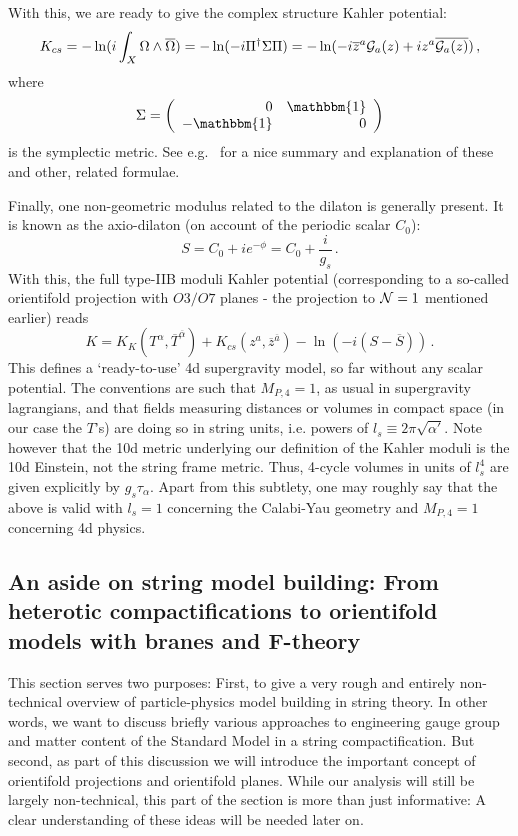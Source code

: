 \documentclass[12pt]{article}
\newcommand{\be}{\begin{equation}}
\newcommand{\ee}{\end{equation}}
\newcommand{\ol}{\overline}
\numberwithin{equation}{section}
\begin{document}
With this, we are ready to give the complex structure Kahler potential:
\be
K_{cs}=-\ln(i\int_X\Omega\wedge \ol{\Omega})=-\ln(-i\Pi^\dagger\Sigma\Pi)=
-\ln(-i\ol{z}^a {\cal G}_a(z)+iz^a\ol{{\cal G}_a(z)})\,,
\ee
where
\be
\Sigma=\left(\begin{array}{rr}0 & \mathbbm{1} \\ -\mathbbm{1} & 0 
\end{array}\right)
\ee
is the symplectic metric. See e.g.~\cite{Giryavets:2005nf} for a nice summary and explanation of these and other, related formulae.

Finally, one non-geometric modulus related to the dilaton is generally present. It is known as the axio-dilaton (on account of the periodic scalar $C_0$):
\be
S=C_0+ie^{-\phi}=C_0+\frac{i}{g_s}\,.
\ee
With this, the full type-IIB moduli Kahler potential (corresponding to a so-called orientifold projection with $O3/O7$ planes - the projection to ${\cal N}=1$ mentioned earlier) reads 
\be
K=K_K(T^\alpha,\ol{T}^{\ol{\alpha}})+K_{cs}(z^a,\ol{z}^{\ol{a}}) -\ln(-i(S-\ol{S}))\,.
\ee
This defines a `ready-to-use' 4d supergravity model, so far without any scalar potential. The conventions are such that $M_{P,4}=1$, as usual in supergravity lagrangians, and that fields measuring distances or volumes in compact space (in our case the $T$'s) are doing so in string units, i.e. powers of $l_s\equiv 2\pi\sqrt{\alpha'}$. Note however that the 10d metric underlying our definition of the Kahler moduli is the 10d Einstein, not the string frame metric. Thus, 4-cycle volumes in units of $l_s^4$ are given explicitly by $g_s \tau_\alpha$. Apart from this subtlety, one may roughly say that the above is valid with $l_s=1$ concerning the Calabi-Yau geometry and $M_{P, 4}=1$ concerning 4d physics. 






\subsection{An aside on string model building:
From heterotic compactifications to orientifold models with branes and F-theory}\label{asi}

This section serves two purposes: First, to give a very rough and entirely non-technical overview of particle-physics model building in string theory. In other words, we want to discuss briefly various approaches to engineering gauge group and matter content of the Standard Model in a string compactification. But second, as part of this discussion we will introduce the important concept of orientifold projections and orientifold planes. While our analysis will still be largely non-technical, this part of the section is more than just informative: A clear understanding of these ideas will be needed later on.
\end{document}
